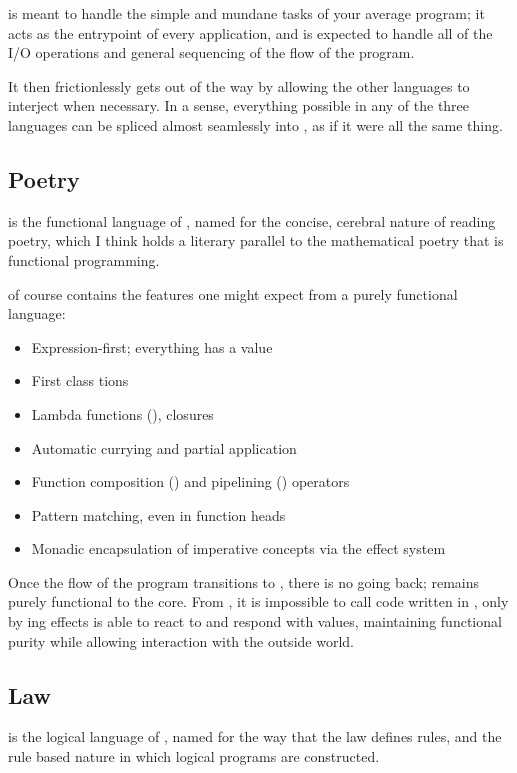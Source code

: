 \Prose{} is meant to handle the simple and mundane tasks of your
average program; it acts as the entrypoint of every application,
and is expected to handle all of the I/O operations and general
sequencing of the flow of the program.

It then frictionlessly gets out of the way by allowing the other languages
to interject when necessary. In a sense, everything possible in any of the
three languages can be spliced almost seamlessly into \Prose{}, as if it
were all the same thing.

\subsection{Poetry}

\Poetry{} is the functional language of \Trilogy{}, named for
the concise, cerebral nature of reading poetry, which I think
holds a literary parallel to the mathematical poetry that is
functional programming.

\Poetry{} of course contains the features one might expect from a purely
functional language:
\begin{itemize}
    \item Expression-first; everything has a value
    \item First class tions
    \item Lambda functions (), closures
    \item Automatic currying and partial application
    \item Function composition (\op{>>}) and pipelining (\op{|>}) operators
    \item Pattern matching, even in function heads
    \item Monadic encapsulation of imperative concepts via the effect system
\end{itemize}

Once the flow of the program transitions to \Poetry{}, there is no going
back; \Poetry{} remains purely functional to the core. From \Poetry{}, it
is impossible to call code written in \Prose{}, only by ing effects
is \Prose{} able to react to \Poetry{} and respond with values, maintaining
functional purity while allowing interaction with the outside world.

\subsection{Law}

\Law{} is the logical language of \Trilogy{}, named for the way that
the law defines rules, and the rule based nature in which logical
programs are constructed.


